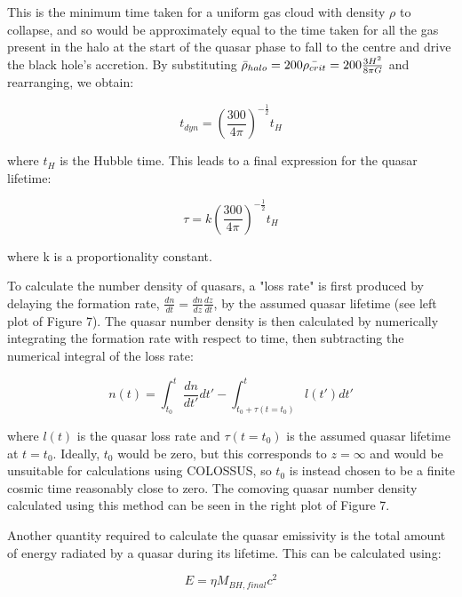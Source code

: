\documentclass[12pt]{article}%
\begin{document}
\noindent This is the minimum time taken for a uniform gas cloud with density $\rho$ to collapse, and so would be approximately equal to the time taken for all the gas present in the halo at the start of the quasar phase to fall to the centre and drive the black hole’s accretion. By substituting $\Bar{\rho}_{halo}=200\Bar{\rho_{crit}}=200\frac{3H^2}{8\pi G}$ and rearranging, we obtain:

\begin{equation}
    t_{dyn}=\left(\frac{300}{4\pi}\right)^{-\frac{1}{2}}t_H
\end{equation}

\noindent where $t_H$ is the Hubble time. This leads to a final expression for the quasar lifetime:

\begin{equation}
    \tau=k\left(\frac{300}{4\pi}\right)^{-\frac{1}{2}}t_H
\end{equation}

\noindent where k is a proportionality constant.\par

To calculate the number density of quasars, a "loss rate" is first produced by delaying the formation rate, $\frac{dn}{dt}=\frac{dn}{dz}\frac{dz}{dt}$, by the assumed quasar lifetime (see left plot of Figure 7). The quasar number density is then calculated by numerically integrating the formation rate with respect to time, then subtracting the numerical integral of the loss rate:

\begin{equation}
    n(t)=\int_{t_0}^t\frac{dn}{dt'}dt'-\int_{t_0+\tau(t=t_0)}^tl(t')dt'
\end{equation}

\noindent where $l(t)$ is the quasar loss rate and $\tau(t=t_0)$ is the assumed quasar lifetime at $t=t_0$. Ideally, $t_0$ would be zero, but this corresponds to $z=\infty$ and would be unsuitable for calculations using COLOSSUS, so $t_0$ is instead chosen to be a finite cosmic time reasonably close to zero. The comoving quasar number density calculated using this method can be seen in the right plot of Figure 7.\par

Another quantity required to calculate the quasar emissivity is the total amount of energy radiated by a quasar during its lifetime. This can be calculated using:

\begin{equation}
    E=\eta M_{BH,final}c^2
\end{equation}
\end{document}
